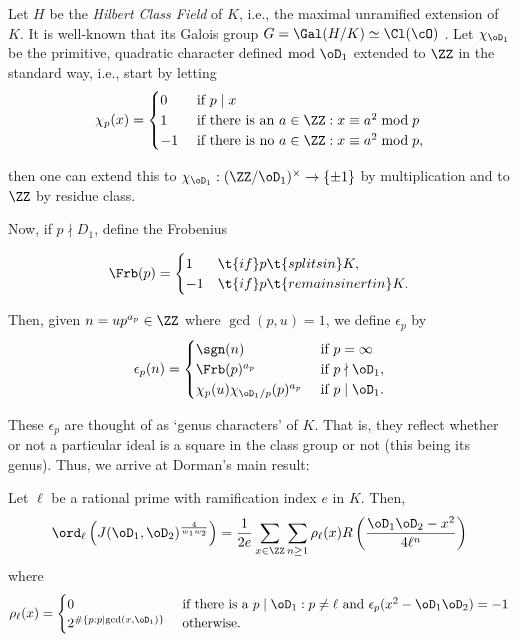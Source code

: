 \documentclass[11pt, proquest]{uwthesis}
\begin{document}
Let $H$ be the {\it Hilbert Class Field} of $K$, i.e., the maximal unramified extension of $K$. It is well-known that its Galois group $G = \Gal(H/K) \simeq \Cl(\cO)$ \cite[Thm~5.23]{Cox:primes_of_the_form}.
Let $\chi_{\oD_1}$ be the primitive, quadratic character defined $\bmod\; \oD_1$ extended to $\ZZ$ in the standard way, i.e., start by letting
$$\chi_p(x) = \begin{cases} 0 &\text{ if } p\mid x\\ 1 &\text{ if there is an } a\in\ZZ: x \equiv a^2\bmod p\\ -1 &\text{ if there is no } a\in\ZZ: x \equiv a^2\bmod p,\end{cases}$$

then one can extend this to $\chi_{\oD_1}:(\ZZ/\oD_1)^\times\to \{\pm 1\}$ by multiplication and to $\ZZ$ by residue class.


Now, if $p\nmid D_1$, define the Frobenius

$$\Frb(p) = \begin{cases} 1 &\t{ if } p \t{ splits in } K,\\ -1 &\t{ if } p \t{ remains inert in } K.\end{cases}$$

Then, given $n = u p^{a_p}\in\ZZ$ where $\gcd(p,u) = 1$, we define $\epsilon_p$ by
$$\epsilon_p(n) = \begin{cases}\sgn(n) &\text{ if } p=\infty\\ \Frb(p)^{a_p} &\text{ if } p\nmid \oD_1,\\ \chi_p(u)\chi_{\oD_1/p}(p)^{a_p} &\text{ if } p\mid \oD_1.\end{cases}$$

These $\epsilon_p$ are thought of as `genus characters' of $K$.
That is, they reflect whether or not a particular ideal is a square in the class group or not (this being its genus).
Thus, we arrive at Dorman's main result:

\begin{theorem}
  Let $\ell$ be a rational prime with ramification index $e$ in $K$. Then,
  $$\ord_{\ell}\left(J(\oD_1,\oD_2)^{\frac{4}{w_1w_2}}\right) = \frac{1}{2e} \sum_{x\in\ZZ}\sum_{n\geq 1}\rho_\ell(x) R\left(\frac{\oD_1\oD_2-x^2}{4\ell^n}\right)$$
  where
  $$\rho_\ell(x) = \begin{cases}0 &\text{ if there is a } p\mid \oD_1: p\ne \ell\text{ and } \epsilon_p(x^2 - \oD_1\oD_2) = -1\\ 2^{\#\{p:p\mid \gcd(x,\oD_1)\}} &\text{ otherwise.}\end{cases}$$
\end{theorem}
\end{document}
